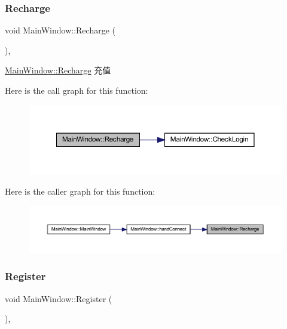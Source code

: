 \subsubsection{\texorpdfstring{Recharge}{Recharge}}
{\footnotesize\ttfamily void Main\+Window\+::\+Recharge (\begin{DoxyParamCaption}{ }\end{DoxyParamCaption})\hspace{0.3cm}{\ttfamily [private]}, {\ttfamily [slot]}}



\mbox{\hyperlink{class_main_window_acfa568cdc9d07d4a8cc9e1eda8fee0e1}{Main\+Window\+::\+Recharge}} 充值 

Here is the call graph for this function\+:
\nopagebreak
\begin{figure}[H]
\begin{center}
\leavevmode
\includegraphics[width=350pt]{class_main_window_acfa568cdc9d07d4a8cc9e1eda8fee0e1_cgraph}
\end{center}
\end{figure}
Here is the caller graph for this function\+:
\nopagebreak
\begin{figure}[H]
\begin{center}
\leavevmode
\includegraphics[width=350pt]{class_main_window_acfa568cdc9d07d4a8cc9e1eda8fee0e1_icgraph}
\end{center}
\end{figure}
\mbox{\label{class_main_window_a6228fbb5ed376fb71633b797affc2e11}} 
\subsubsection{\texorpdfstring{Register}{Register}}
{\footnotesize\ttfamily void Main\+Window\+::\+Register (\begin{DoxyParamCaption}{ }\end{DoxyParamCaption})\hspace{0.3cm}{\ttfamily [private]}, {\ttfamily [slot]}}



